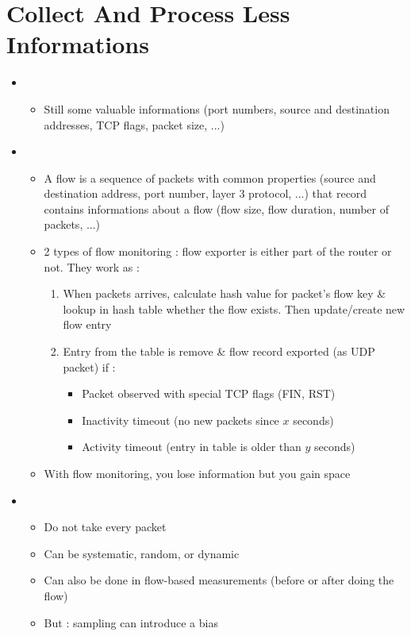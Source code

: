 \section{Collect And Process Less Informations}

\begin{itemize}
    \item {}
    \begin{itemize}
        \item Still some valuable informations (port numbers, source and destination addresses, TCP flags, packet size, ...)
    \end{itemize}
    \item {}
    \begin{itemize}
        \item A flow is a sequence of packets with common properties (source and destination address, port number, layer 3 protocol, ...) that record contains informations about a flow (flow size, flow duration, number of packets, ...)
        \item 2 types of flow monitoring : flow exporter is either part of the router or not. They work as :
        \begin{enumerate}
            \item When packets arrives, calculate hash value for packet's flow key \& lookup in hash table whether the flow exists. Then update/create new flow entry
            \item Entry from the table is remove \& flow record exported (as UDP packet) if :
            \begin{itemize}
                \item Packet observed with special TCP flags (FIN, RST)
                \item Inactivity timeout (no new packets since $x$ seconds)
                \item Activity timeout (entry in table is older than $y$ seconds)
            \end{itemize}
        \end{enumerate}
        \item With flow monitoring, you lose information but you gain space
    \end{itemize}
    \item {}
    \begin{itemize}
        \item Do not take every packet
        \item Can be systematic, random, or dynamic
        \item Can also be done in flow-based measurements (before or after doing the flow)
        \item But : sampling can introduce a bias
    \end{itemize}
\end{itemize}

